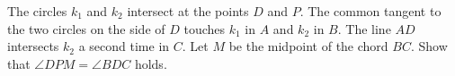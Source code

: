 The circles $k_1$ and $k_2$ intersect at the points $D$ and $P$. 
The common tangent to the two circles on the side of $D$ touches $k_1$ in $A$ and $k_2$ in $B$.
The line $AD$ intersects $k_2$ a second time in $C$. Let $M$ be the midpoint of the chord $BC$.
Show that $\angle DPM = \angle BDC$ holds.